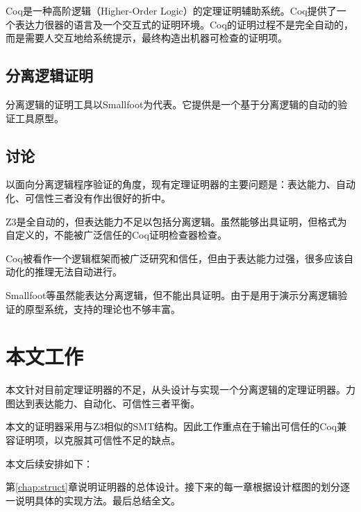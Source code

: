 Coq\cite{coq}是一种高阶逻辑（Higher-Order Logic）的定理证明辅助系统。Coq提供了一个表达力很器的语言及一个交互式的证明环境。Coq的证明过程不是完全自动的，而是需要人交互地给系统提示，最终构造出机器可检查的证明项。

\subsection{分离逻辑证明}
分离逻辑的证明工具以Smallfoot\cite{smallfoot}为代表。它提供是一个基于分离逻辑的自动的验证工具原型。

\subsection{讨论}
以面向分离逻辑程序验证的角度，现有定理证明器的主要问题是：表达能力、自动化、可信性三者没有作出很好的折中。

Z3是全自动的，但表达能力不足以包括分离逻辑。虽然能够出具证明，但格式为自定义的，不能被广泛信任的Coq证明检查器检查。

Coq被看作一个逻辑框架而被广泛研究和信任，但由于表达能力过强，很多应该自动化的推理无法自动进行。

Smallfoot等虽然能表达分离逻辑，但不能出具证明。由于是用于演示分离逻辑验证的原型系统，支持的理论也不够丰富。

\section{本文工作}
本文针对目前定理证明器的不足，从头设计与实现一个分离逻辑的定理证明器。力图达到表达能力、自动化、可信性三者平衡。

本文的证明器采用与Z3相似的SMT结构。因此工作重点在于输出可信任的Coq兼容证明项，以克服其可信性不足的缺点。

本文后续安排如下：

第\ref{chap:struct}章说明证明器的总体设计。接下来的每一章根据设计框图的划分逐一说明具体的实现方法。最后总结全文。
